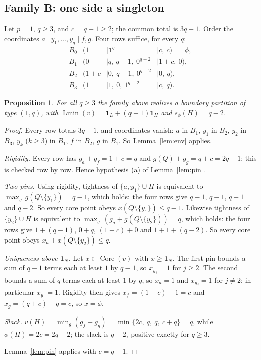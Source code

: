 \documentclass[11pt]{article}
\newtheorem{proposition}[theorem]{Proposition}
\newcommand{\core}{\operatorname{Core}}
\newcommand{\Lmin}{\operatorname{Lmin}}
\newcommand{\one}{\mathbf 1}
\begin{document}
\subsection{Family B: one side a singleton}

Let $p=1$, $q\ge3$, and $c=q-1\ge2$; the common total is $3q-1$.  Order the
coordinates $a\mid y_1,\dots,y_q\mid f,g$.  Four rows suffice, for every $q$:
\[
\begin{array}{llll}
 B_0 &(1     &\mid \one^q                &\mid c,\ c)\ =\ \phi,\\
 B_1 &(0     &\mid q,\ q-1,\ 0^{q-2}     &\mid 1+c,\ 0),\\
 B_2 &(1+c   &\mid 0,\ q-1,\ 0^{q-2}     &\mid 0,\ q),\\
 B_3 &(1     &\mid 1,\ 0,\ 1^{q-2}       &\mid c,\ q).
\end{array}
\]

\begin{proposition}\label{prop:famB}
For all $q\ge3$ the family above realizes a boundary partition of type
$(1,q)$, with $\Lmin(v)=\one_L+(q-1)\one_H$ and $s_\phi(H)=q-2$.
\end{proposition}

\begin{proof}
Every row totals $3q-1$, and coordinates vanish: $a$ in $B_1$, $y_1$ in $B_2$,
$y_2$ in $B_3$, $y_k$ ($k\ge3$) in $B_1$, $f$ in $B_2$, $g$ in $B_1$.  So
Lemma~\ref{lem:env} applies.

\emph{Rigidity.}  Every row has $g_a+g_f=1+c=q$ and $g(Q)+g_g=q+c=2q-1$; this
is checked row by row.  Hence hypothesis (a) of Lemma~\ref{lem:pin}.

\emph{Two pins.}  Using rigidity, tightness of $\{a,y_1\}\cup H$ is equivalent
to $\max_g\,g(Q\setminus\{y_1\})=q-1$, which holds: the four rows give $q-1$,
$q-1$, $q-1$ and $q-2$.  So every core point obeys $x(Q\setminus\{y_1\})\le
q-1$.  Likewise tightness of $\{y_2\}\cup H$ is equivalent to
$\max_g\,(g_a+g(Q\setminus\{y_2\}))=q$, which holds: the four rows give
$1+(q-1)$, $0+q$, $(1+c)+0$ and $1+1+(q-2)$.  So every core point obeys
$x_a+x(Q\setminus\{y_2\})\le q$.

\emph{Uniqueness above $\one_N$.}  Let $x\in\core(v)$ with $x\ge\one_N$.  The
first pin bounds a sum of $q-1$ terms each at least $1$ by $q-1$, so
$x_{y_j}=1$ for $j\ge2$.  The second bounds a sum of $q$ terms each at least
$1$ by $q$, so $x_a=1$ and $x_{y_j}=1$ for $j\ne2$; in particular
$x_{y_1}=1$.  Rigidity then gives $x_f=(1+c)-1=c$ and $x_g=(q+c)-q=c$, so
$x=\phi$.

\emph{Slack.}  $v(H)=\min_g(g_f+g_g)=\min\{2c,\ q,\ q,\ c+q\}=q$, while
$\phi(H)=2c=2q-2$; the slack is $q-2$, positive exactly for $q\ge3$.

Lemma~\ref{lem:pin} applies with $c=q-1$.
\end{proof}
\end{document}

